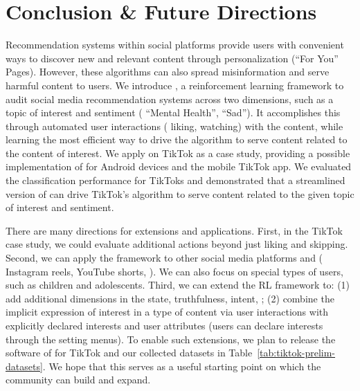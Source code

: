 \section{Conclusion \& Future Directions}
\label{sec:autolike-conclusion}

Recommendation systems within social platforms provide users with convenient ways to discover new and relevant content through personalization (``For You'' Pages). 
However, these algorithms can also spread misinformation and serve harmful content to users. We introduce \autolike{}, a reinforcement learning framework to audit social media recommendation systems across two dimensions, such as a topic of interest and sentiment (\eg{} ``Mental Health'', ``Sad''). It accomplishes this through automated user interactions (\eg{} liking, watching) with the content, while learning the most efficient way to drive the algorithm to serve content related to the content of interest. We apply \autolike{} on TikTok as a case study, providing a possible implementation of \autolike{} for Android devices and the mobile TikTok app. We evaluated the classification performance for TikToks and demonstrated that a streamlined version of \autolike{} can drive TikTok's algorithm to serve content related to the given topic of interest and sentiment. 



There are many directions for extensions and applications.
First, in the TikTok case study, we could evaluate additional actions beyond just liking and skipping. %
Second, we can apply the \autolike{} framework to other social media platforms and \fyp{} (\eg{} Instagram reels, YouTube shorts, \etc). We can also focus on special types of users, such as children and adolescents.
Third, we can extend the RL framework to: (1) add additional dimensions in the state, \eg{} truthfulness, intent, \etc; (2) combine the implicit expression of interest in a type of content via user interactions with explicitly declared interests and user attributes (\eg  users can declare interests through the setting menus). 
To enable such extensions, we plan to release the software of \autolike{} for TikTok and our collected datasets in Table~\ref{tab:tiktok-prelim-datasets}. We hope that this serves as a useful starting point on which the community can build and expand.



